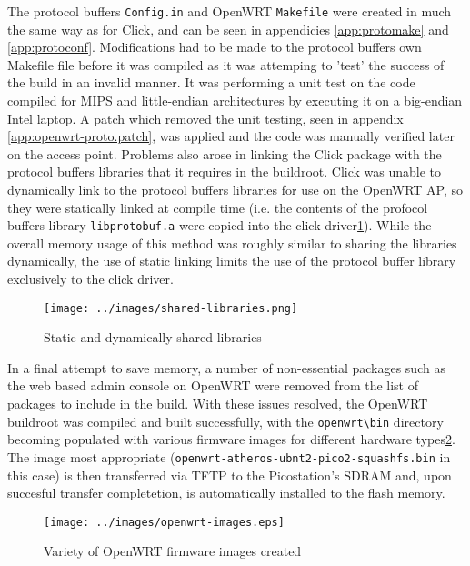 	The protocol buffers \texttt{Config.in} and OpenWRT \texttt{Makefile} were created in much the same way as for Click, and can be seen in appendicies \ref{app:protomake} and \ref{app:protoconf}. Modifications had to be made to the protocol buffers own Makefile file before it was compiled as it was attemping to 'test' the success of the build in an invalid manner. It was performing a unit test on the code compiled for MIPS and little-endian architectures by executing it on a big-endian Intel laptop. A patch which removed the unit testing, seen in appendix \ref{app:openwrt-proto.patch}, was applied and the code was manually verified later on the access point. Problems also arose in linking the Click package with the protocol buffers libraries that it requires in the buildroot. Click was unable to dynamically link to the protocol buffers libraries for use on the OpenWRT AP, so they were statically linked at compile time (i.e. the contents of the profocol buffers library \texttt{libprotobuf.a} were copied into the click driver\ref{fig:sharedlibs}). While the overall memory usage of this method was roughly similar to sharing the libraries dynamically, the use of static linking limits the use of the protocol buffer library exclusively to the click driver. 

	\begin{figure}[ht]
	  \centering
	  \texttt{[image: ../images/shared-libraries.png]}
	  \caption{Static and dynamically shared libraries\cite{MTJ}}
	  \label{fig:sharedlibs}
	 \end{figure}

	In a final attempt to save memory, a number of non-essential packages such as the web based admin console on OpenWRT were removed from the list of packages to include in the build. With these issues resolved, the OpenWRT buildroot was compiled and built successfully, with the \texttt{openwrt\textbackslash bin} directory becoming populated with various firmware images for different hardware types\ref{fig:openwrt-images}. The image most appropriate (\texttt{openwrt-atheros-ubnt2-pico2-squashfs.bin} in this case) is then transferred via TFTP  to the Picostation's SDRAM and, upon succesful transfer completetion, is automatically installed to the flash memory.
	
	\begin{figure}[ht]
	\centering
	\texttt{[image: ../images/openwrt-images.eps]}
	\caption{Variety of OpenWRT firmware images created}
	\label{fig:openwrt-images}
	\end{figure}

